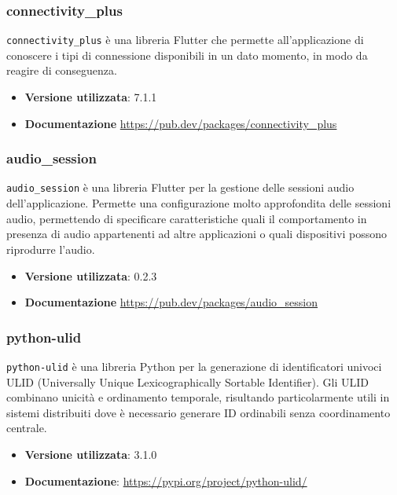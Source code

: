 \documentclass[a4paper,12pt]{article}
\begin{document}
\subsubsection{connectivity\_plus}
\texttt{connectivity\_plus} è una libreria Flutter che permette all'applicazione di conoscere i tipi di connessione disponibili in un dato momento, in modo da reagire di conseguenza.
\begin{itemize}
    \item \textbf{Versione utilizzata}: 7.1.1
    \item \textbf{Documentazione} \url{https://pub.dev/packages/connectivity_plus}
\end{itemize}

\subsubsection{audio\_session}
\texttt{audio\_session} è una libreria Flutter per la gestione delle sessioni audio dell'applicazione. Permette una configurazione molto approfondita delle sessioni audio, permettendo di specificare caratteristiche quali il comportamento in presenza di audio appartenenti ad altre applicazioni o quali dispositivi possono riprodurre l'audio.
\begin{itemize}
    \item \textbf{Versione utilizzata}: 0.2.3
    \item \textbf{Documentazione} \url{https://pub.dev/packages/audio_session}
\end{itemize}

\subsubsection{python-ulid}
\texttt{python-ulid} è una libreria Python per la generazione di identificatori univoci ULID (Universally Unique Lexicographically Sortable Identifier). Gli ULID combinano unicità e ordinamento temporale, risultando particolarmente utili in sistemi distribuiti dove è necessario generare ID ordinabili senza coordinamento centrale.
\begin{itemize}
    \item \textbf{Versione utilizzata}: 3.1.0
    \item \textbf{Documentazione}: \url{https://pypi.org/project/python-ulid/}
\end{itemize}
\end{document}
